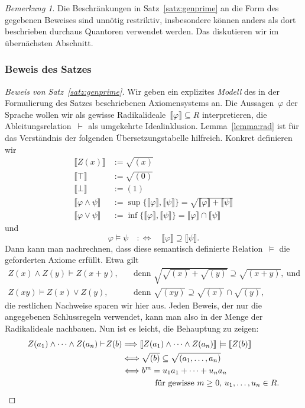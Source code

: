 \documentclass[a4paper,ngerman,12pt]{scrartcl}
\theoremstyle{definition}
\theoremstyle{plain}
\theoremstyle{remark}
\newtheorem{bem}[defn]{Bemerkung}
\newcommand{\brak}[1]{\llbracket {#1} \rrbracket}
\newcommand{\seq}[1]{\mathrel{\vdash\!\!\!_{#1}}}
\renewcommand{\_}{\mathpunct{.}\,}
\newcommand{\?}{\,{:}\,}
\begin{document}
\begin{bem}Die Beschränkungen in Satz~\ref{satz:genprime} an die Form des
gegebenen Beweises sind unnötig restriktiv, insbesondere können anders als dort
beschrieben durchaus Quantoren verwendet werden. Das diskutieren wir im
übernächsten Abschnitt.\end{bem}


\subsubsection*{Beweis des Satzes}

\begin{proof}[Beweis von Satz~\ref{satz:genprime}]
Wir geben ein explizites \emph{Modell} des in der Formulierung des Satzes
beschriebenen Axiomensystems an. Die Aussagen~$\varphi$ der Sprache wollen wir als
gewisse Radikalideale~$\brak{\varphi} \subseteq R$ interpretieren, die
Ableitungsrelation~$\seq{}$ als umgekehrte Idealinklusion.
Lemma~\ref{lemma:rad} ist für das Verständnis der folgenden Übersetzungstabelle
hilfreich. Konkret definieren wir
\begin{align*}
  \brak{Z(x)} &:= \sqrt{(x)} \\
  \brak{\top} &:= \sqrt{(0)} \\
  \brak{\bot} &:= (1) \\
  \brak{\varphi \wedge \psi} &:= \sup\{\brak{\varphi},\brak{\psi}\} = \sqrt{\brak{\varphi} + \brak{\psi}} \\
  \brak{\varphi \vee \psi} &:= \inf\{\brak{\varphi},\brak{\psi}\} = \brak{\varphi} \cap \brak{\psi}
\end{align*}
und
\[ \varphi \models \psi \quad:\Longleftrightarrow\quad
  \brak{\varphi} \supseteq \brak{\psi}. \]
Dann kann man nachrechnen, dass diese semantisch definierte Relation~$\models$
die geforderten Axiome erfüllt. Etwa gilt
\begin{align*}
  Z(x) \wedge Z(y) \models Z(x+y), &
    \quad\text{denn } \sqrt{\sqrt{(x)} + \sqrt{(y)}} \supseteq \sqrt{(x+y)},\ \text{und} \\
  Z(xy) \models Z(x) \vee Z(y), &
    \quad\text{denn } \sqrt{(xy)} \supseteq \sqrt{(x)} \cap \sqrt{(y)},
\end{align*}
die restlichen Nachweise sparen wir hier aus. Jeden Beweis, der nur die
angegebenen Schlussregeln verwendet, kann man also in der Menge der
Radikalideale nachbauen. Nun ist es leicht, die Behauptung zu zeigen:
\begin{align*}
  Z(a_1) \wedge \cdots \wedge Z(a_n) \seq{} Z(b)
  &\Longrightarrow
  \brak{Z(a_1) \wedge \cdots \wedge Z(a_n)} \models \brak{Z(b)} \\
  &\Longleftrightarrow
  \sqrt{(b)} \subseteq \sqrt{(a_1,\ldots,a_n)} \\
  &\Longleftrightarrow
  b^m = u_1 a_1 + \cdots + u_n a_n \\
  &\qquad\qquad
    \text{für gewisse~$m \geq 0$, $u_1,\ldots,u_n \in R$.} \qedhere
\end{align*}
\end{proof}
\end{document}
